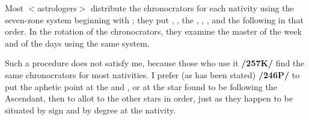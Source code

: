 Most $<$astrologers$>$ distribute the chronocrators for each nativity using the seven-zone system beginning with \Saturn; they put \Jupiter, \Mars, the \Sun, \Venus, \Mercury, and the \Moon\xspace following in that order. In the rotation of the chronocrators, they examine the master of the week and of the days using the same system. 

Such a procedure does not satisfy me, because those who use it \textbf{/257K/} find the same chronocrators for most nativities. I prefer (as has been stated) \textbf{/246P/} to put the aphetic point at the \Sun\xspace and \Moon, or at the star found to be following the Ascendant, then to allot to the other stars in order, just as they happen to be situated by sign and by degree at the nativity.

\newpage